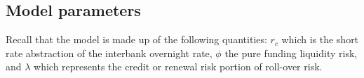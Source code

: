 \documentclass[12pt,a4paper]{article}
\theoremstyle{plain}
\numberwithin{equation}{section}
\begin{document}
%
%
%

\subsection{Model parameters}
Recall that the model is made up of the following quantities: $r_c$ which is the short rate abstraction of the interbank overnight rate, $\phi$ the pure funding liquidity risk, and $\lambda$ which represents the credit or renewal risk portion of roll-over risk.
\end{document}
